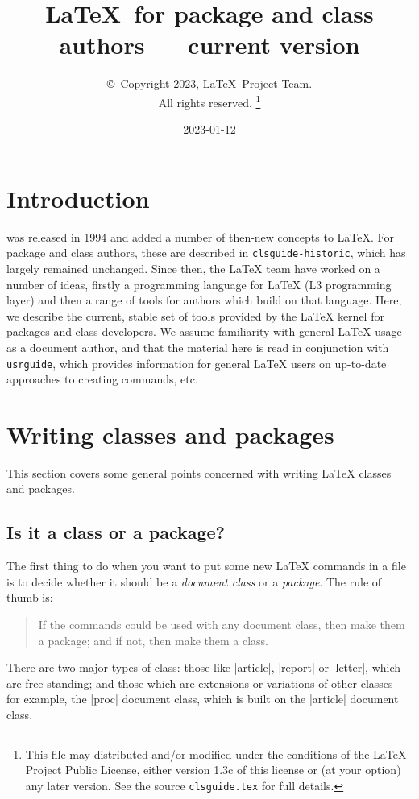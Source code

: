 \documentclass{ltxguide}
\title{\LaTeX\ for package and class authors --- current version}
\author{\copyright~Copyright 2023, \LaTeX\ Project Team.\\
   All rights reserved.%
   \footnote{This file may distributed and/or modified under the
     conditions of the \LaTeX{} Project Public License, either version 1.3c
     of this license or (at your option) any later version. See the source
    \texttt{clsguide.tex} for full details.}%
}
\date{2023-01-12}
\begin{document}
\maketitle

\tableofcontents

\section{Introduction}

\LaTeXe{} was released in 1994 and added a number of then-new concepts to
\LaTeX{}. For package and class authors, these are described in
\texttt{clsguide-historic}, which has largely remained unchanged. Since then,
the \LaTeX{} team have worked on a number of ideas, firstly a programming
language for \LaTeX{} (L3 programming layer) and then a range of tools for
authors which build on that language. Here, we describe the current, stable set
of tools provided by the \LaTeX{} kernel for packages and class developers. We
assume familiarity with general \LaTeX{} usage as a document author, and that
the material here is read in conjunction with \texttt{usrguide}, which provides
information for general \LaTeX{} users on up-to-date approaches to creating
commands, etc.

\section{Writing classes and packages}
\label{Sec:writing}

This section covers some general points concerned with writing
\LaTeX{} classes and packages.

\subsection{Is it a class or a package?}
\label{Sec:classorpkg}

The first thing to do when you want to put some new \LaTeX{} commands
in a file is to decide whether it should be a \emph{document class} or a
\emph{package}.  The rule of thumb is:
\begin{quote}
  If the commands could be used with any document class, then make
  them a package; and if not, then make them a class.
\end{quote}

There are two major types of class: those like |article|, |report| or
|letter|, which are free-standing; and those which are extensions or
variations of other classes---for example, the |proc| document class,
which is built on the |article| document class.
\end{document}
